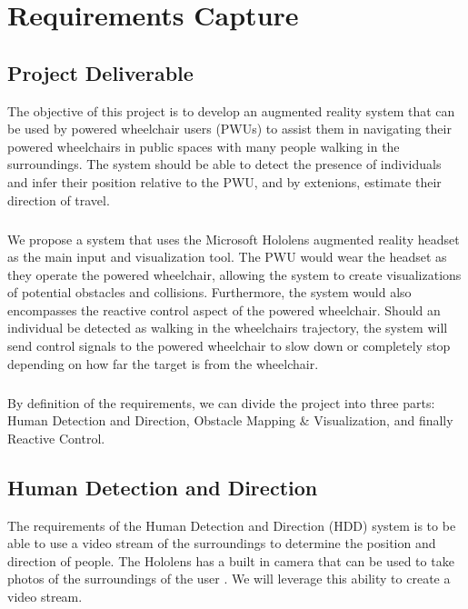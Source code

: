 \chapter{Requirements Capture}

\section{Project Deliverable}
The objective of this project is to develop an augmented reality system that can be used by powered wheelchair users (PWUs) to assist them in navigating their powered wheelchairs in public spaces with many people walking in the surroundings. The system should be able to detect the presence of individuals and infer their position relative to the PWU, and by extenions, estimate their direction of travel.

\paragraph{}We propose a system that uses the Microsoft Hololens augmented reality headset as the main input and visualization tool. The PWU would wear the headset as they operate the powered wheelchair, allowing the system to create visualizations of potential obstacles and collisions. Furthermore, the system would also encompasses the reactive control aspect of the powered wheelchair. Should an individual be detected as walking in the wheelchairs trajectory, the system will send control signals to the powered wheelchair to slow down or completely stop depending on how far the target is from the wheelchair.

\paragraph{} By definition of the requirements, we can divide the project into three parts: Human Detection and Direction, Obstacle Mapping \& Visualization, and finally Reactive Control.

\section{Human Detection and Direction}
The requirements of the Human Detection and Direction (HDD) system is to be able to use a video stream of the surroundings to determine the position and direction of people. The Hololens has a built in camera that can be used to take photos of the surroundings of the user \cite{Chacon-Quesada}. We will leverage this ability to create a video stream.

